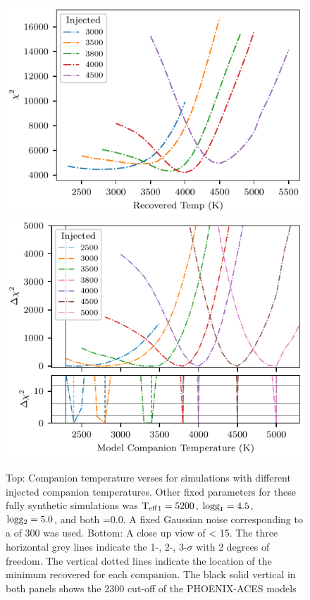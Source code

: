 \begin{figure}
    \centering
    \includegraphics[width=0.7\linewidth]{figures/companion_recovery/chi2_shape_investigation}
    \includegraphics[width=0.7\linewidth]{figures/companion_recovery/chi2_shape_investigation_with_delta}
    \caption[Shape of simulated \textchisquared{} with different injected companion temperatures.]{Top: Companion temperature verses \textchisquared{} for simulations with different injected companion temperatures.
    Other fixed parameters for these fully synthetic simulations was \({\textrm{T}_{\mathrm{eff}}}_{1}=5200\)\K{}, \(\textrm{logg}_1=4.5\), \(\textrm{logg}{}_2=5.0\), and both \feh{}=0.0.
    A fixed Gaussian noise corresponding to a \snr{} of 300 was used.
    Bottom: A close up view of \textchisquared{} < 15.
    The three horizontal grey lines indicate the 1-, 2-, 3-$\sigma$ with 2 degrees of freedom.
    The vertical dotted lines indicate the location of the minimum \textchisquared{} recovered for each companion.
    The black solid vertical in both panels shows the 2300\K{} cut-off of the {PHOENIX-ACES} models}
    \label{fig:injection_shape}
\end{figure}




